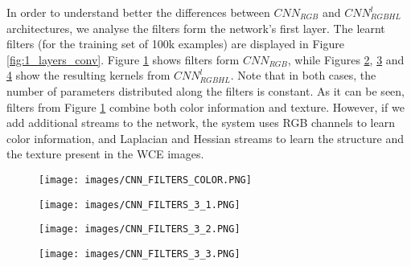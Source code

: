 \documentclass[review,12pt,3p]{elsarticle}
\begin{document}
In order to understand better the differences between $CNN_{RGB}$ and $CNN^l_{RGBHL}$ architectures, we analyse the filters form the network's first layer. The learnt filters (for the training set of 100k examples) are displayed in Figure \ref{fig:1_layers_conv}. Figure \ref{fig:1_layers_conv_RGB} shows filters form $CNN_{RGB}$, while Figures \ref{fig:1_layers_conv_RGBHL1}, \ref{fig:1_layers_conv_RGBHL2} and \ref{fig:1_layers_conv_RGBHL3} show the resulting kernels from $CNN^l_{RGBHL}$. Note that in both cases, the number of parameters distributed along the filters is constant. As it can be seen, filters from Figure \ref{fig:1_layers_conv_RGB} combine both color information and texture. However, if we add additional streams to the network, the system uses RGB channels to learn color information, and Laplacian and Hessian streams to learn the structure and the texture present in the WCE images.

\begin{figure*}[!ht]
    \centering
    \begin{subfigure}[b]{0.22\textwidth}
        \texttt{[image: images/CNN\_FILTERS\_COLOR.PNG]}
        \caption{}
        \label{fig:1_layers_conv_RGB}
    \end{subfigure}
    \begin{subfigure}[b]{0.22\textwidth}
        \texttt{[image: images/CNN\_FILTERS\_3\_1.PNG]}
        \caption{}
        \label{fig:1_layers_conv_RGBHL1}
    \end{subfigure}
     \begin{subfigure}[b]{0.22\textwidth}
        \texttt{[image: images/CNN\_FILTERS\_3\_2.PNG]}
        \caption{}
        \label{fig:1_layers_conv_RGBHL2}
    \end{subfigure}
     \begin{subfigure}[b]{0.22\textwidth}
        \texttt{[image: images/CNN\_FILTERS\_3\_3.PNG]}
        \caption{}
        \label{fig:1_layers_conv_RGBHL3}
    \end{subfigure}
    \caption{Visualization of the learnt filters: (a) 64 filters from $CNN_{RGB}$, (b) 32 color filters from $CNN^l_{RGBHL}$, (c) 16 Laplacian filters from $CNN^l_{RGBHL}$, (d) 16 Hessian filters from $CNN^l_{RGBHL}$. All filters are $25 \times 25$ pixels. The figure is best seen in color.}
    \label{fig:1_layers_conv}
\end{figure*}
\end{document}
